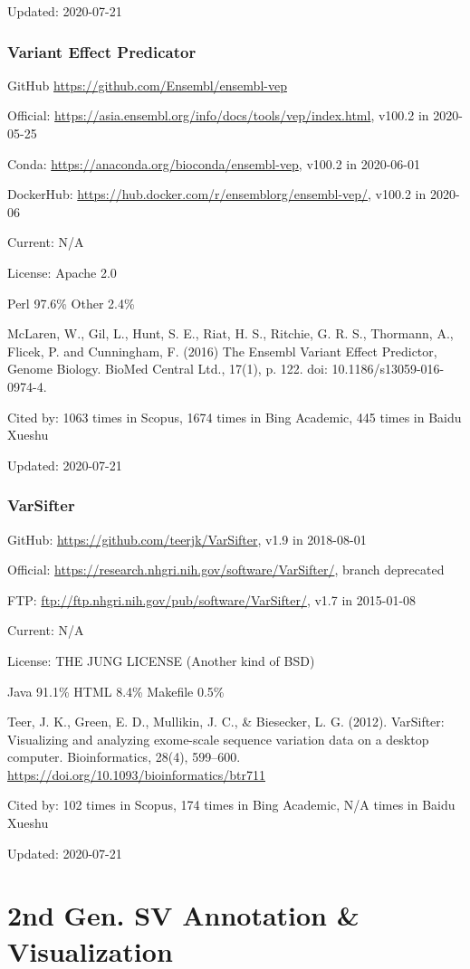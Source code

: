 \documentclass[]{article}
\newcommand{\cb}[3]{\par Cited by: {\color{blue}\Huge #1} times in Scopus, {\color{blue}\Huge #2} times in Bing Academic, {\color{blue}\Huge #3} times in Baidu Xueshu}
\begin{document}
Updated: 2020-07-21

\section{Variant Effect Predicator}

GitHub \url{https://github.com/Ensembl/ensembl-vep}

Official: \url{https://asia.ensembl.org/info/docs/tools/vep/index.html}, v100.2 in 2020-05-25

Conda: \url{https://anaconda.org/bioconda/ensembl-vep}, v100.2 in 2020-06-01

DockerHub: \url{https://hub.docker.com/r/ensemblorg/ensembl-vep/}, v100.2 in 2020-06

Current: N/A

License: Apache 2.0

Perl 97.6\% Other 2.4\%

McLaren, W., Gil, L., Hunt, S. E., Riat, H. S., Ritchie, G. R. S., Thormann, A., Flicek, P. and Cunningham, F. (2016) The Ensembl Variant Effect Predictor, Genome Biology. BioMed Central Ltd., 17(1), p. 122. doi: 10.1186/s13059-016-0974-4.\cb{1063}{1674}{445}

Updated: 2020-07-21

\section{VarSifter}

GitHub: \url{https://github.com/teerjk/VarSifter}, v1.9 in 2018-08-01

Official: \url{https://research.nhgri.nih.gov/software/VarSifter/}, branch deprecated

FTP: \url{ftp://ftp.nhgri.nih.gov/pub/software/VarSifter/}, v1.7 in 2015-01-08

Current: N/A

License: THE JUNG LICENSE (Another kind of BSD)

Java 91.1\% HTML 8.4\% Makefile 0.5\%

Teer, J. K., Green, E. D., Mullikin, J. C., \& Biesecker, L. G. (2012). VarSifter: Visualizing and analyzing exome-scale sequence variation data on a desktop computer. Bioinformatics, 28(4), 599–600. \url{https://doi.org/10.1093/bioinformatics/btr711}\cb{102}{174}{N/A}

Updated: 2020-07-21

\part{2nd Gen. SV Annotation \& Visualization}
\end{document}
